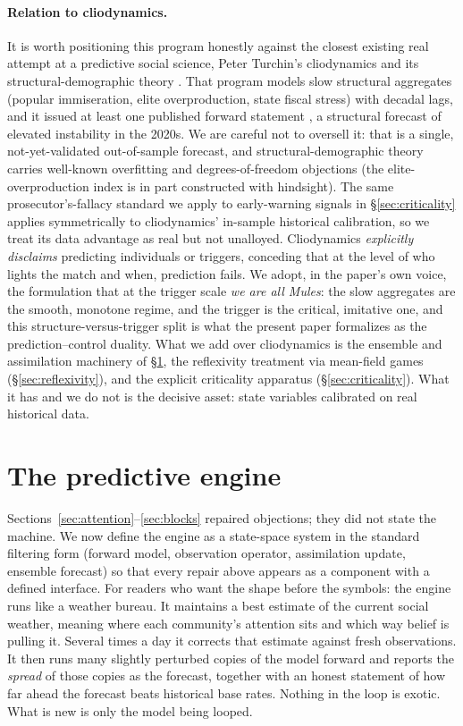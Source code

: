 \documentclass[11pt]{article}
\begin{document}
\paragraph{Relation to cliodynamics.} It is worth positioning this program honestly against the closest existing real attempt at a predictive social science, Peter Turchin's cliodynamics and its structural-demographic theory \cite{turchin2003,turchin2016}. That program models slow structural aggregates (popular immiseration, elite overproduction, state fiscal stress) with decadal lags, and it issued at least one published forward statement \cite{turchin2010}, a structural forecast of elevated instability in the 2020s. We are careful not to oversell it: that is a single, not-yet-validated out-of-sample forecast, and structural-demographic theory carries well-known overfitting and degrees-of-freedom objections (the elite-overproduction index is in part constructed with hindsight). The same prosecutor's-fallacy standard we apply to early-warning signals in \S\ref{sec:criticality} applies symmetrically to cliodynamics' in-sample historical calibration, so we treat its data advantage as real but not unalloyed. Cliodynamics \emph{explicitly disclaims} predicting individuals or triggers, conceding that at the level of who lights the match and when, prediction fails. We adopt, in the paper's own voice, the formulation that at the trigger scale \emph{we are all Mules}: the slow aggregates are the smooth, monotone regime, and the trigger is the critical, imitative one, and this structure-versus-trigger split is what the present paper formalizes as the prediction--control duality. What we add over cliodynamics is the ensemble and assimilation machinery of \S\ref{sec:engine}, the reflexivity treatment via mean-field games (\S\ref{sec:reflexivity}), and the explicit criticality apparatus (\S\ref{sec:criticality}). What it has and we do not is the decisive asset: state variables calibrated on real historical data.

\section{The predictive engine}
\label{sec:engine}

Sections~\ref{sec:attention}--\ref{sec:blocks} repaired objections; they did not state the machine. We now define the engine as a state-space system in the standard filtering form (forward model, observation operator, assimilation update, ensemble forecast) so that every repair above appears as a component with a defined interface. For readers who want the shape before the symbols: the engine runs like a weather bureau. It maintains a best estimate of the current social weather, meaning where each community's attention sits and which way belief is pulling it. Several times a day it corrects that estimate against fresh observations. It then runs many slightly perturbed copies of the model forward and reports the \emph{spread} of those copies as the forecast, together with an honest statement of how far ahead the forecast beats historical base rates. Nothing in the loop is exotic. What is new is only the model being looped.
\end{document}
